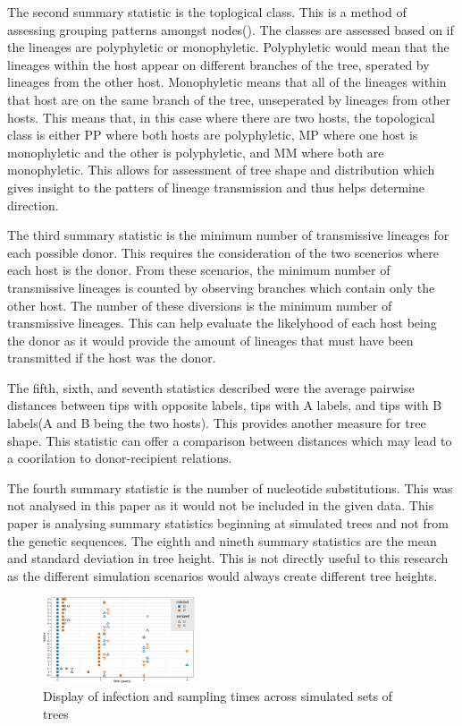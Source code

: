 \documentclass[final,5p,times,twocolumn,authoryear]{elsarticle}
\begin{document}
The second summary statistic is the toplogical class. This is a method of assessing grouping patterns amongst nodes(\cite{doi:10.1073/pnas.1522930113}). The classes are assessed based on if the lineages are polyphyletic or monophyletic. Polyphyletic would mean that the lineages within the host appear on different branches of the tree, sperated by lineages from the other host. Monophyletic means that all of the lineages within that host are on the same branch of the tree, unseperated by lineages from other hosts. This means that, in this case where there are two hosts, the topological class is either PP where both hosts are polyphyletic, MP where one host is monophyletic and the other is polyphyletic, and MM where both are monophyletic. This allows for assessment of tree shape and distribution which gives insight to the patters of lineage transmission and thus helps determine direction.

The third summary statistic is the minimum number of transmissive lineages for each possible donor. This requires the consideration of the two scenerios where each host is the donor. From these scenarios, the minimum number of transmissive lineages is counted by observing branches which contain only the other host. The number of these diversions is the minimum number of transmissive lineages. This can help evaluate the likelyhood of each host being the donor as it would provide the amount of lineages that must have been transmitted if the host was the donor.

The fifth, sixth, and seventh statistics described were the average pairwise distances between tips with opposite labels, tips with A labels, and tips with B labels(A and B being the two hosts). This provides another measure for tree shape. This statistic can offer a comparison between distances which may lead to a coorilation to donor-recipient relations.

The fourth summary statistic is the number of nucleotide substitutions. This was not analysed in this paper as it would not be included in the given data. This paper is analysing summary statistics beginning at simulated trees and not from the genetic sequences. The eighth and nineth summary statistics are the mean and standard deviation in tree height. This is not directly useful to this research as the different simulation scenarios would always create different tree heights.


\begin{figure}
  \centering
  \includegraphics[width=0.4\textwidth, angle=0]{histories}
  \caption{Display of infection and sampling times across simulated sets of trees}
  \label{fig_mom0}%
\end{figure}
\end{document}

